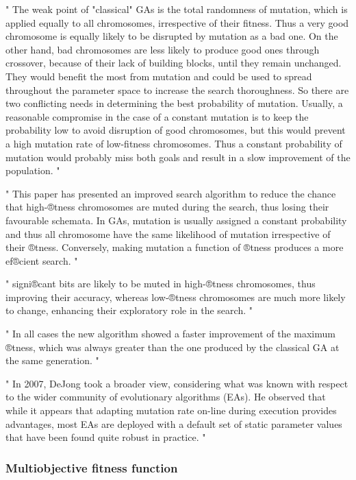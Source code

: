 "
The weak point of "classical" GAs is the total randomness of mutation, which is applied equally to all chromosomes, irrespective of their fitness. Thus a very good chromosome is equally likely to be disrupted by mutation as a bad one. On the other hand, bad chromosomes are less likely to produce good ones through crossover, because of their lack of building blocks, until they remain unchanged. They would benefit the most from mutation and could be used to spread throughout the parameter space to increase the search thoroughness. So there are two conflicting needs in determining the best probability of mutation. Usually, a reasonable compromise in the case of a constant mutation is to keep the probability low to avoid disruption of good chromosomes, but this would prevent a high mutation rate of low-fitness chromosomes. Thus a constant probability of mutation would probably miss both goals and result in a slow improvement of the population.
"\cite{marsili_libelli_adaptive_2000}


"
This paper has presented an improved search algorithm to reduce the chance that high-®tness chromosomes are muted during the search, thus losing their favourable schemata. In GAs, mutation is usually assigned a constant probability and thus all chromosome have the same likelihood of mutation irrespective of their ®tness. Conversely, making mutation a function of ®tness produces a more ef®cient search.
"\cite{marsili_libelli_adaptive_2000}

"
signi®cant bits are likely to be muted in high-®tness chromosomes, thus improving their accuracy, whereas low-®tness chromosomes are much more likely to change, enhancing their exploratory role in the search.
"\cite{marsili_libelli_adaptive_2000}

"
In all cases the new algorithm showed a faster improvement of the maximum ®tness, which was always greater than the one produced by the classical GA at the same generation.
"\cite{marsili_libelli_adaptive_2000}


"
In 2007, DeJong took a broader view, considering what was known with respect to the wider community of evolutionary algorithms (EAs). He observed that while it appears that adapting mutation rate on-line during execution provides advantages, most EAs are deployed with a default set of static parameter values that have been found quite robust in practice.
"\cite{mills_determining_2015}
\fi


\iffalse
\subsubsection{Multiobjective fitness function}

